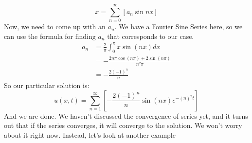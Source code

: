 \documentclass{article}
\begin{document}
\[
x = \sum_{n = 0}^{\infty}\left[a_{n}\sin{nx}\right]
\]
\noindent Now, we need to come up with an $a_{n}$. We have a Fourier Sine Series here, so we can use the formula for finding $a_{n}$ that corresponds to our case.
\begin{align*}
a_{n} &= \frac{2}{\pi}\int_{0}^{\pi} x\sin{\left(nx\right)}dx\\
&= -\frac{2n\pi \cos{\left(n\pi\right)} + 2\sin{\left(n\pi\right)}}{n^{2}\pi}\\
&= -\frac{2(-1)^{n}}{n}
\end{align*}
\noindent So our particular solution is:
\[
u(x,t) = \sum_{n = 1}^{\infty}\left[-\frac{2(-1)^{n}}{n}\sin{\left(n x\right)}e^{-\left(n\right)^{2}t}\right]
\]
\noindent And we are done. We haven't discussed the convergence of series yet, and it turns out that if the series converges, it will converge to the solution. We won't worry about it right now. Instead, let's look at another example
\end{document}
